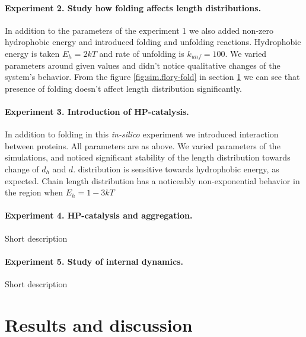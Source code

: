 \documentclass[12pt]{paper}
\begin{document}
\paragraph{Experiment 2. Study how folding affects length distributions.}
In addition to the parameters of the  experiment 1 we also added non-zero hydrophobic energy and 
introduced folding and unfolding reactions.
 Hydrophobic energy is taken $E_h=2kT$ and rate of unfolding is $k_{unf}=100$. We varied parameters 
around given values and didn't notice qualitative changes of the system's behavior.
From the figure \ref{fig:sim.flory-fold} in section \ref{sec:res} we can see 
that presence of folding doesn't affect length distribution significantly.

\paragraph{Experiment 3. Introduction of HP-catalysis.}
In addition to folding in this \textit{in-silico} experiment we introduced interaction between 
proteins. All parameters are as above. We varied parameters of the simulations, and noticed 
significant stability of the length distribution towards change of $d_h$ and $d$. distribution is 
sensitive towards hydrophobic energy, as expected. Chain length distribution has a noticeably 
non-exponential behavior in the region when $E_h= 1-3 kT$

\paragraph{Experiment 4. HP-catalysis and aggregation.}
Short description


\paragraph{Experiment 5. Study of internal dynamics.}
Short description




\section{Results and discussion}\label{sec:res}
\end{document}
